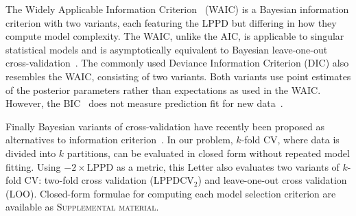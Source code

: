 \documentclass{IOS-Book-Article}
\begin{document}
The Widely Applicable Information Criterion~\cite{watanabe2010asymptotic,watanabe2013widely} (WAIC) is a Bayesian information criterion with two variants, each featuring the LPPD but differing in how they compute model complexity.  The WAIC, unlike the AIC, is applicable to singular statistical models and is asymptotically equivalent to Bayesian leave-one-out cross-validation~\cite{watanabe2010asymptotic}. The commonly used Deviance Information Criterion (DIC) also resembles the WAIC,  consisting of two variants. Both variants use point estimates of the posterior parameters rather than expectations as used in the WAIC.
However, the BIC~\cite{narlikar2013one} does not measure prediction fit for new data~\cite{gelman2014understanding}.

Finally Bayesian variants of cross-validation have recently been proposed as alternatives to information criterion~\cite{gelman2014understanding}.  In our problem, $k$-fold CV, where data is divided into $k$ partitions, can be evaluated in closed form without repeated model fitting. Using $-2\times \textrm{LPPD}$ as a metric, this Letter also evaluates two variants of $k$-fold CV:
two-fold cross validation (LPPDCV$_2$) and leave-one-out cross validation (LOO).  Closed-form formulae for computing each model selection criterion are available as \textsc{Supplemental material}. 
\end{document}
